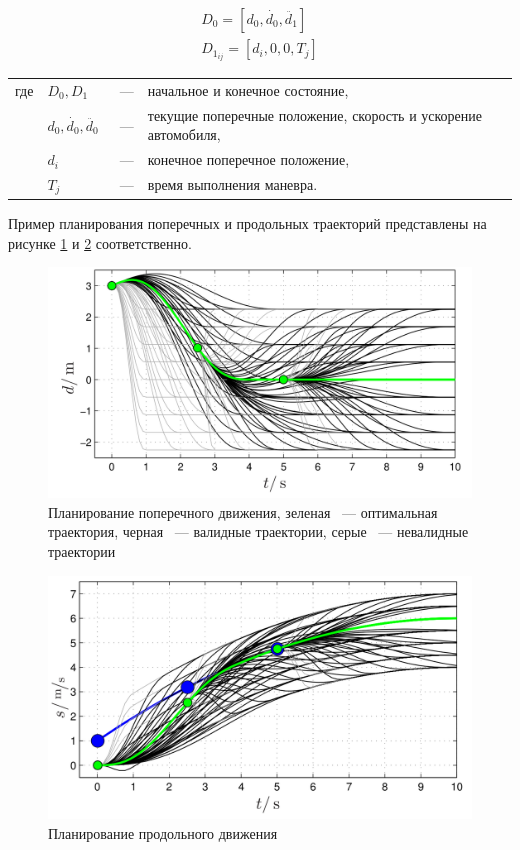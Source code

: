 \begin{eqnarray}
    D_0 = [d_0, \dot{d_0}, \ddot{d_1}] \\
    D_{1_{ij}} = [d_i, 0, 0, T_j]
\end{eqnarray}

\noindent\begin{tabularx}{\linewidth}{lllX}
    где & $D_0, D_1$                    &~---& начальное и конечное состояние, \\
        & $d_0, \dot{d_0}, \ddot{d_0}$  &~---& текущие поперечные положение, скорость и ускорение автомобиля,\\
        & $d_i$                         &~---& конечное поперечное положение,\\
        & $T_j$                         &~---& время выполнения маневра.
\end{tabularx}

Пример планирования поперечных и продольных траекторий представлены на рисунке \ref{img:junior_pathes_lat} и
\ref{img:junior_pathes_lon} соответственно.

\begin{figure}[h]
    \centering
    \includegraphics[width=0.7\linewidth]{images/junior_pathes_lat}
    \caption{Планирование поперечного движения, зеленая ~--- оптимальная траектория, черная ~--- валидные траектории,
        серые ~--- невалидные траектории}
    \label{img:junior_pathes_lat}
\end{figure}

\begin{figure}[h]
    \centering
    \includegraphics[width=0.7\linewidth]{images/junior_pathes_lon}
    \caption{Планирование продольного движения}
    \label{img:junior_pathes_lon}
\end{figure}

